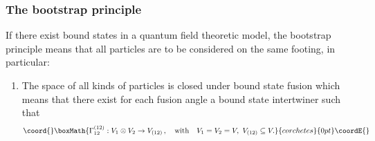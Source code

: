 \documentclass[a4paper,a4paper]{article}
\begin{document}
\subsubsection{The \textbf{bootstrap principle}}

If there exist bound states in a quantum field theoretic model, the
bootstrap principle means that all particles are to be considered on the
same footing, in particular:

\begin{enumerate}
\item  The space of all kinds of particles \coordHE{} is closed under bound state
fusion which means that there exist for each fusion angle a bound state
intertwiner \coordHE{} such that 
\[\coord{}\boxMath{
\Gamma _{12}^{(12)}:V_{1}\otimes V_{2}\rightarrow V_{(12)}\,,\quad \mathrm{%
with}\quad V_{1}=V_{2}=V,\ V_{(12)}\subseteq V. 
}{corchetes}{0pt}\coordE{}\]


\end{enumerate}
\end{document}
